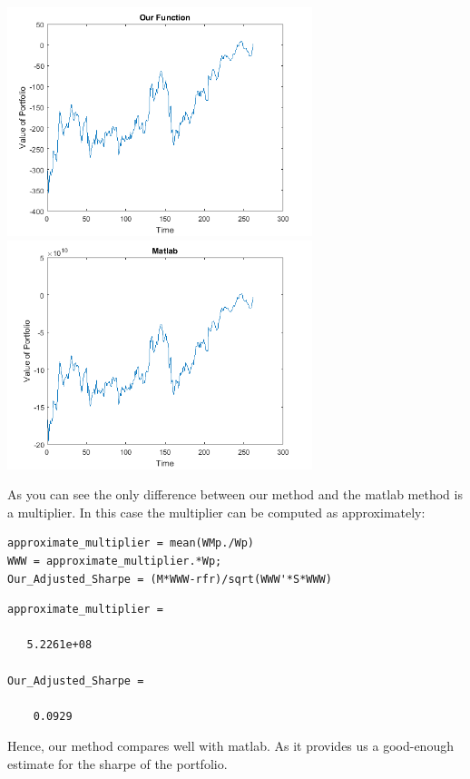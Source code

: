 \documentclass[12pt,titlepage,a4paper]{article}
\begin{document}
\includegraphics [width=3.5in]{testing_01.png}\includegraphics [width=3.5in]{testing_02.png}
\begin{par}
As you can see the only difference between our method and the matlab method is a multiplier. In this case the multiplier can be computed as approximately:
\end{par} \vspace{1em}
\begin{verbatim}
approximate_multiplier = mean(WMp./Wp)
WWW = approximate_multiplier.*Wp;
Our_Adjusted_Sharpe = (M*WWW-rfr)/sqrt(WWW'*S*WWW)
\end{verbatim}

        \color{lightgray} \begin{verbatim}
approximate_multiplier =

   5.2261e+08

Our_Adjusted_Sharpe =

    0.0929

\end{verbatim} \color{black}
    \begin{par}
Hence, our method compares well with matlab. As it provides us a good-enough estimate for the sharpe of the portfolio.
\end{par} \vspace{1em}
\end{document}
